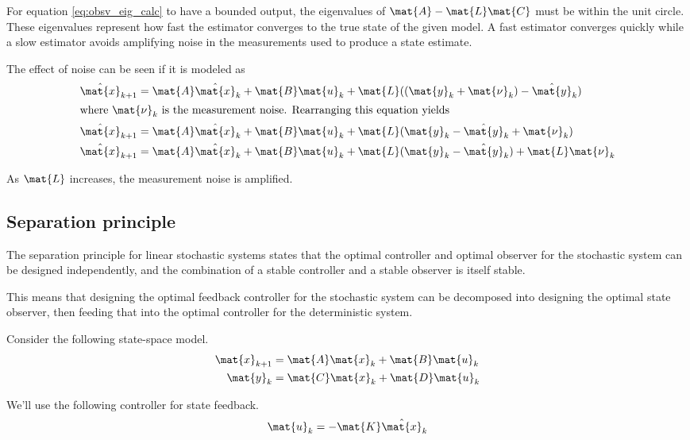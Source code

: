 For equation \eqref{eq:obsv_eig_calc} to have a bounded output, the eigenvalues
of $\mat{A} - \mat{L}\mat{C}$ must be within the unit circle. These eigenvalues
represent how fast the estimator converges to the true \gls{state} of the given
\gls{model}. A fast estimator converges quickly while a slow estimator avoids
amplifying noise in the measurements used to produce a \gls{state} estimate.

The effect of noise can be seen if it is modeled
 as
\begin{align*}
  \hat{\mat{x}}_{k+1} &= \mat{A}\hat{\mat{x}}_k + \mat{B}\mat{u}_k +
    \mat{L} ((\mat{y}_k + \mat{\nu}_k) - \hat{\mat{y}}_k) \\
  \intertext{where $\mat{\nu}_k$ is the measurement noise. Rearranging this
    equation yields}
  \hat{\mat{x}}_{k+1} &= \mat{A}\hat{\mat{x}}_k + \mat{B}\mat{u}_k +
    \mat{L} (\mat{y}_k - \hat{\mat{y}}_k + \mat{\nu}_k) \\
  \hat{\mat{x}}_{k+1} &= \mat{A}\hat{\mat{x}}_k + \mat{B}\mat{u}_k +
    \mat{L} (\mat{y}_k - \hat{\mat{y}}_k) + \mat{L}\mat{\nu}_k
\end{align*}

As $\mat{L}$ increases, the measurement noise is amplified.

\subsection{Separation principle}

The separation principle for linear stochastic systems states that the optimal
controller and optimal observer for the stochastic system can be designed
independently, and the combination of a stable controller and a stable observer
is itself stable.

This means that designing the optimal feedback controller for the stochastic
system can be decomposed into designing the optimal state observer, then feeding
that into the optimal controller for the deterministic system.

Consider the following state-space model.
\begin{align*}
  \mat{x}_{k+1} &= \mat{A}\mat{x}_k + \mat{B}\mat{u}_k \\
  \mat{y}_k &= \mat{C}\mat{x}_k + \mat{D}\mat{u}_k
\end{align*}

We'll use the following controller for state feedback.
\begin{equation*}
  \mat{u}_k = -\mat{K}\hat{\mat{x}}_k
\end{equation*}


